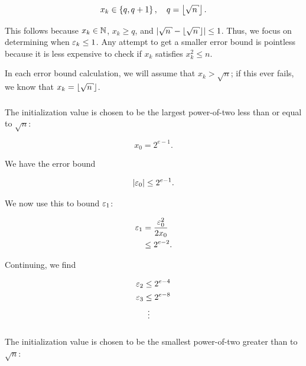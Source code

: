 \begin{equation}
    x_{k}\in\braces{q, q+1}, \quad q=\floor{\sqrt{n}}.
\end{equation}

\noindent
This follows because $x_{k}\in\mathbb{N}$, $x_{k}\ge q$,
and $\abs{\sqrt{n} - \floor{\sqrt{n}}} \le 1$.
Thus, we focus on determining when $\varepsilon_{k}\le1$.
Any attempt to get a smaller error bound
is pointless because it is less expensive to check
if $x_{k}$ satisfies $x_{k}^{2} \le n$.

In each error bound calculation, we will assume that $x_{k} > \sqrt{n}$;
if this ever fails, we know that $x_{k} = \floor{\sqrt{n}}$.


\subsubsection{\UnrolledOne{}}
\label{app:error_bounds:unrolled1}

The initialization value is chosen to be the largest power-of-two
less than or equal to $\sqrt{n}$:

\begin{equation}
    x_{0} = 2^{e-1}.
\end{equation}

\noindent
We have the error bound

\begin{equation}
    \left| \varepsilon_{0} \right| \le 2^{e-1}.
\end{equation}

\noindent
We now use this to bound $\varepsilon_{1}$:

\begin{align}
    \varepsilon_{1} &= \frac{\varepsilon_{0}^{2}}{2x_{0}} \nonumber\\
        &\le 2^{e-2}.
\end{align}

\noindent
Continuing, we find

\begin{align}
    \varepsilon_{2} &\le 2^{e-4} \nonumber\\
    \varepsilon_{3} &\le 2^{e-8} \nonumber\\
        &\ \vdots
\end{align}


\subsubsection{\UnrolledTwo{}}
\label{app:error_bounds:unrolled2}

The initialization value is chosen to be the smallest power-of-two
greater than to $\sqrt{n}$:


